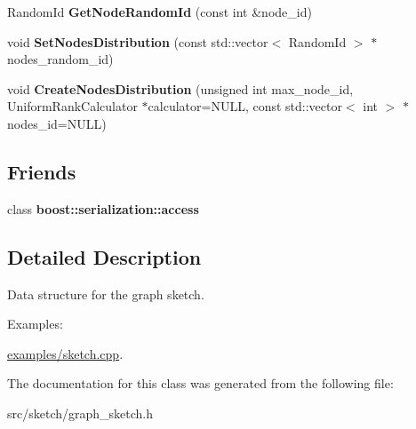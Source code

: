 \begin{DoxyCompactItemize}
\item 
\hypertarget{classall__distance__sketch_1_1GraphSketch_af9bbe3a02d29880b7218c52b53375e31}{}Random\+Id {\bfseries Get\+Node\+Random\+Id} (const int \&node\+\_\+id)\label{classall__distance__sketch_1_1GraphSketch_af9bbe3a02d29880b7218c52b53375e31}

\item 
\hypertarget{classall__distance__sketch_1_1GraphSketch_af57117f7a70b714dedc882d8f213207c}{}void {\bfseries Set\+Nodes\+Distribution} (const std\+::vector$<$ Random\+Id $>$ $\ast$nodes\+\_\+random\+\_\+id)\label{classall__distance__sketch_1_1GraphSketch_af57117f7a70b714dedc882d8f213207c}

\item 
\hypertarget{classall__distance__sketch_1_1GraphSketch_aab18dbc5e7923b7bfe036777c9862ddb}{}void {\bfseries Create\+Nodes\+Distribution} (unsigned int max\+\_\+node\+\_\+id, Uniform\+Rank\+Calculator $\ast$calculator=N\+U\+L\+L, const std\+::vector$<$ int $>$ $\ast$nodes\+\_\+id=N\+U\+L\+L)\label{classall__distance__sketch_1_1GraphSketch_aab18dbc5e7923b7bfe036777c9862ddb}

\end{DoxyCompactItemize}
\subsection*{Friends}
\begin{DoxyCompactItemize}
\item 
\hypertarget{classall__distance__sketch_1_1GraphSketch_ac98d07dd8f7b70e16ccb9a01abf56b9c}{}class {\bfseries boost\+::serialization\+::access}\label{classall__distance__sketch_1_1GraphSketch_ac98d07dd8f7b70e16ccb9a01abf56b9c}

\end{DoxyCompactItemize}


\subsection{Detailed Description}
Data structure for the graph sketch. \begin{Desc}
\item[Examples\+: ]\par
\hyperlink{examples_2sketch_8cpp-example}{examples/sketch.\+cpp}.\end{Desc}


The documentation for this class was generated from the following file\+:\begin{DoxyCompactItemize}
\item 
src/sketch/graph\+\_\+sketch.\+h\end{DoxyCompactItemize}
